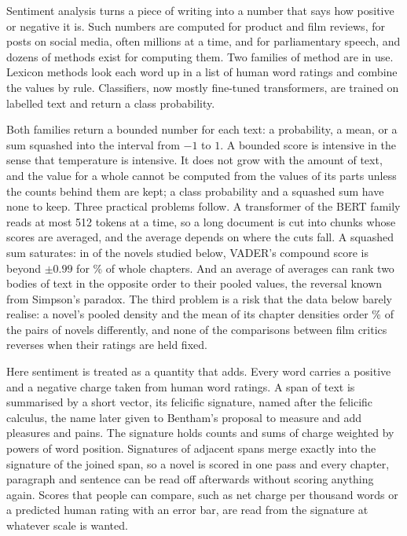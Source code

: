 
\noindent Sentiment analysis turns a piece of writing into a number that says how positive or negative it is. Such numbers are computed for product and film reviews\cite{pang2002}, for posts on social media, often millions at a time\cite{dodds2011,golder2011}, and for parliamentary speech\cite{proksch2019}, and dozens of methods exist for computing them\cite{ribeiro2016}. Two families of method are in use. Lexicon methods look each word up in a list of human word ratings and combine the values by rule\cite{dodds2010,hutto2014,taboada2011,tausczik2010}. Classifiers, now mostly fine-tuned transformers, are trained on labelled text and return a class probability\cite{devlin2019,liu2019roberta,sanh2019}.

Both families return a bounded number for each text: a probability, a mean, or a sum squashed into the interval from $-1$ to $1$. A bounded score is intensive in the sense that temperature is intensive. It does not grow with the amount of text, and the value for a whole cannot be computed from the values of its parts unless the counts behind them are kept; a class probability and a squashed sum have none to keep. Three practical problems follow. A transformer of the BERT family reads at most 512 tokens at a time\cite{devlin2019}, so a long document is cut into chunks whose scores are averaged, and the average depends on where the cuts fall. A squashed sum saturates: in \vaderBooks{} of the novels studied below, VADER's compound score is beyond $\pm0.99$ for \vaderSaturated\% of whole chapters. And an average of averages can rank two bodies of text in the opposite order to their pooled values, the reversal known from Simpson's paradox\cite{simpson1951,blyth1972,lerman2018}. The third problem is a risk that the data below barely realise: a novel's pooled density and the mean of its chapter densities order \pairFlip\% of the \nPairs{} pairs of novels differently, and none of the \critPairs{} comparisons between film critics reverses when their ratings are held fixed.

Here sentiment is treated as a quantity that adds. Every word carries a positive and a negative charge taken from human word ratings. A span of text is summarised by a short vector, its felicific signature, named after the felicific calculus, the name later given to Bentham's proposal to measure and add pleasures and pains\cite{bentham1789}. The signature holds counts and sums of charge weighted by powers of word position. Signatures of adjacent spans merge exactly into the signature of the joined span, so a novel is scored in one pass and every chapter, paragraph and sentence can be read off afterwards without scoring anything again. Scores that people can compare, such as net charge per thousand words or a predicted human rating with an error bar, are read from the signature at whatever scale is wanted.

